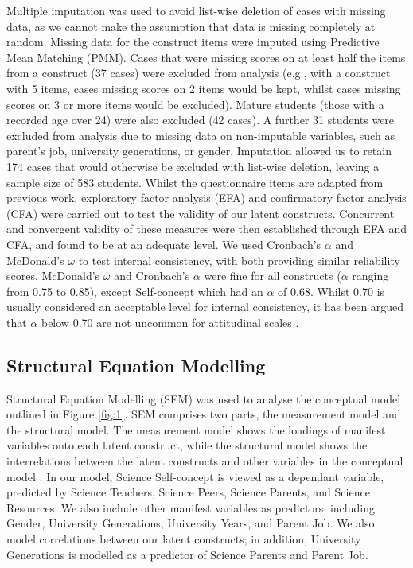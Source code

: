 \documentclass[smallextended]{svjour3}       %
\begin{document}
Multiple imputation was used to avoid list-wise deletion of cases with missing data, as we cannot make the assumption that data is missing completely at random. Missing data for the construct items were imputed using Predictive Mean Matching (PMM). Cases that were missing scores on at least half the items from a construct (37 cases) were excluded from analysis (e.g., with a construct with 5 items, cases missing scores on 2 items would be kept, whilst cases missing scores on 3 or more items would be excluded). Mature students (those with a recorded age over 24) were also excluded (42 cases). A further 31 students were excluded from analysis due to missing data on non-imputable variables, such as parent's job, university generations, or gender. Imputation allowed us to retain 174 cases that would otherwise be excluded with list-wise deletion, leaving a  sample size of 583 students. Whilst the questionnaire items are adapted from previous work, exploratory factor analysis (EFA) and confirmatory factor analysis (CFA) were carried out to test the validity of our latent constructs. Concurrent and convergent validity \cite{campbell1959convergent} of these measures were then established through EFA and CFA, and found to be at an adequate level. We used Cronbach's $\alpha$ and McDonald's $\omega$ to test internal consistency, with both providing similar reliability scores. McDonald's $\omega$ and Cronbach's $\alpha$ were fine for all constructs ($\alpha$ ranging from 0.75 to 0.85), except Self-concept which had an $\alpha$ of 0.68. Whilst 0.70 is usually considered an acceptable level for internal consistency, it has been argued that $\alpha$ below 0.70 are not uncommon for attitudinal scales \cite{field2012discovering}. 

\subsection*{Structural Equation Modelling}
Structural Equation Modelling (SEM) was used to analyse the conceptual model outlined in Figure \ref{fig:1}. SEM comprises two parts, the measurement model and the structural model. The measurement model shows the loadings of manifest variables onto each latent construct, while the structural model shows the interrelations between the latent constructs and other variables in the conceptual model \cite{schreiber2006reporting}. In our model, Science Self-concept is viewed as a dependant variable, predicted by Science Teachers, Science Peers, Science Parents, and Science Resources. We also include other manifest variables as predictors, including Gender, University Generations, University Years, and Parent Job. We also model correlations between our latent constructs; in addition, University Generations is modelled as a predictor of Science Parents and Parent Job.
\end{document}
